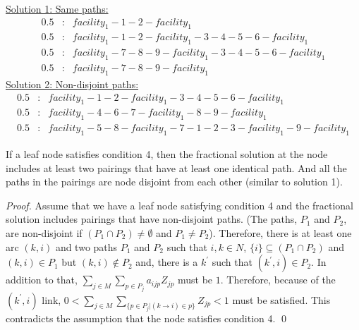 \noindent \underline{Solution 1: Same paths:}
\begin{eqnarray*}
0.5 &: & facility_1-1-2-facility_1 \\ 
0.5 &: & facility_1-1-2-facility_1-3-4-5-6-facility_1 \\
0.5 &: & facility_1-7-8-9-facility_1-3-4-5-6-facility_1 \\
0.5 &: & facility_1-7-8-9-facility_1 
\end{eqnarray*}
\underline{Solution 2: Non-disjoint paths:}
\begin{eqnarray*}
0.5 &: & facility_1-1-2-facility_1-3-4-5-6-facility_1 \\
0.5 &: & facility_1-4-6-7-facility_1-8-9-facility_1 \\
0.5 &: & facility_1-5-8-facility_1-7-1-2-3-facility_1-9-facility_1 
\end{eqnarray*}

\begin{lemma} If a leaf node satisfies condition 4, then the fractional 
solution at the node includes 
at least two pairings that have at least one identical path. And all the paths in 
the pairings are node disjoint from each other (similar to solution 1).
\end{lemma} 
\begin{proof} 
Assume that we have a leaf node satisfying condition 4 and
the fractional solution includes pairings 
that have non-disjoint paths. (The paths, $P_1$ and $P_2$, are non-disjoint
if $(P_1\cap P_2)\neq \emptyset$ and $P_1\neq P_2$). Therefore, there is at least one
arc $(k,i)$ and two paths $P_1$ and $P_2$ such that $i,k \in N$, 
$\{i\} \subseteq (P_1\cap P_2)$ and $(k,i) \in P_1$ but $(k,i) \notin P_2$
and, there is a $k^{'}$ such that $(k^{'},i) \in P_2$.
In addition to that, 
$\sum_{j \in M}\sum_{p \in P_j}a_{ijp} Z_{jp}$ must be $1$. Therefore, 
because of the $(k^{'},i)$ link, $0 < \sum_{j \in M}\sum_{\{p \in P_j | (k\to i) \in p\}} Z_{jp} <1$
must be satisfied. This contradicts the assumption that the node satisfies
condition 4. \qed
\end{proof}

